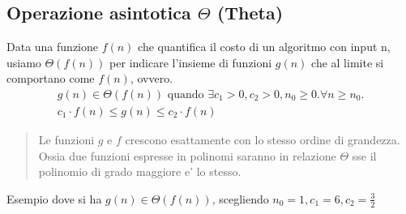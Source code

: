 \documentclass{article}
\begin{document}
\begin{center}
\end{center}

\subsection{Operazione asintotica $\Theta$ (Theta)}

Data una funzione $f(n)$ che quantifica il costo di un algoritmo con input n, usiamo
$\Theta(f(n))$ per indicare l'insieme di funzioni $g(n)$ che al limite si comportano come $f(n)$, ovvero. 
\begin{align*}
g(n) \in \Theta(f(n)) \text{ quando } \exists c_1 > 0, c_2 > 0, n_0 \geq 0. \forall n \geq n_0. \\
c_1 \cdot f(n) \leq g(n) \leq c_2 \cdot f(n)
\end{align*}

\begin{quote}
  Le funzioni $g$ e $f$ crescono esattamente con lo stesso ordine di grandezza.
  Ossia due funzioni espresse in polinomi saranno in relazione $\Theta$ sse il polinomio di grado maggiore e' lo stesso.
\end{quote}

Esempio dove si ha $g(n) \in \Theta(f(n))$, scegliendo $n_0 = 1, c_1 = 6, c_2 = \frac{3}{2}$

\begin{center}
\end{center}
\end{document}
